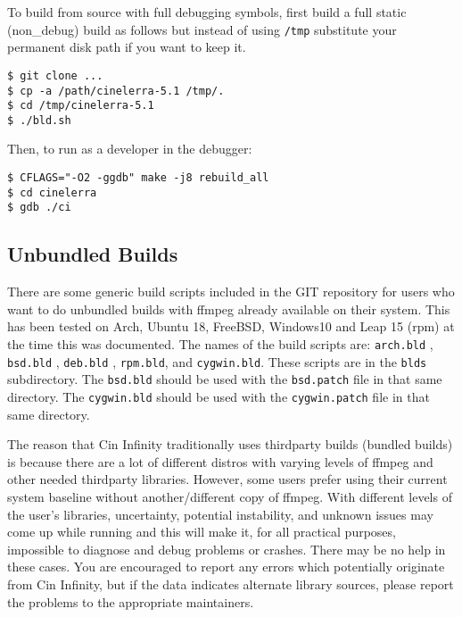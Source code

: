 To build from source with full debugging symbols, first build a full static (non\_debug) build as follows but instead of using \texttt{/tmp} substitute your permanent disk path if you want to keep it.

\begin{lstlisting}[numbers=none]
$ git clone ...
$ cp -a /path/cinelerra-5.1 /tmp/.
$ cd /tmp/cinelerra-5.1
$ ./bld.sh
\end{lstlisting}


Then, to run as a developer in the debugger:

\begin{lstlisting}[numbers=none]
$ CFLAGS="-O2 -ggdb" make -j8 rebuild_all
$ cd cinelerra
$ gdb ./ci
\end{lstlisting}


\subsection{Unbundled Builds}%
\label{sub:unbundled_builds}

There are some generic build scripts included in the \CGG{} GIT repository for users who want to do unbundled builds with ffmpeg already available on their system.  
This has been tested on Arch, Ubuntu 18, FreeBSD, Windows10 and Leap 15 (rpm) at the time this was documented.  
The names of the build scripts are:  \texttt{arch.bld} ,  \texttt{bsd.bld} , \texttt{deb.bld} , \texttt{rpm.bld}, and \texttt{cygwin.bld}.  
These scripts are in the \texttt{blds} subdirectory.  
The \texttt{bsd.bld} should be used with the \texttt{bsd.patch} file in that same directory.
The \texttt{cygwin.bld} should be used with the \texttt{cygwin.patch} file in that same directory.

The reason that Cin Infinity traditionally uses thirdparty builds (bundled builds) is because there are a lot of different distros with varying levels of ffmpeg and other needed thirdparty libraries.  
However, some users prefer using their current system baseline without another/different copy of ffmpeg.  
With different levels of the user’s libraries, uncertainty, potential instability, and unknown issues may come up while running \CGG{} and this will make it, for all practical purposes, impossible to diagnose and debug problems or crashes.  
There may be no help in these cases.  You are encouraged to report any errors which potentially originate from Cin Infinity, but if the data indicates alternate library sources, please report the problems to the appropriate maintainers.

